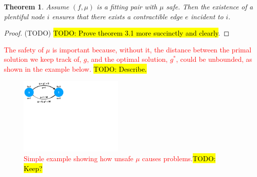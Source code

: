 \documentclass[11pt]{article}
\newtheorem{theorem}{Theorem}[section]
\theoremstyle{definition}
\theoremstyle{definition}
\newcommand{\rewrite}[1]{\textcolor{red}{#1}}
\newcommand{\todo}[1]{\hl{TODO: #1}}
\begin{document}
    \begin{theorem} Assume $(f, \mu)$ is a fitting pair with $\mu$ safe.
    Then the existence of a plentiful node $i$ ensures
    that there exists a contractible edge $e$ incident to $i$.
    \end{theorem}
    \begin{proof} (TODO)
    \todo{Prove theorem 3.1 more succinctly and clearly}.
    \end{proof}

    \rewrite{The safety of $\mu$ is important because, without it, the distance between
    the primal solution we keep track of, $g$, and the optimal solution, $g^*$, could
    be unbounded, as shown in the example below.} \todo{Describe.}

    \begin{figure}[h]
    \centering
    \includegraphics[width=0.45\textwidth]{figs/unsafe.pdf}
    \caption{
    \label{fig:unsafe}
    \rewrite{Simple example showing how unsafe $\mu$ causes problems.}\todo{Keep?}
    }
    \end{figure}
\end{document}
